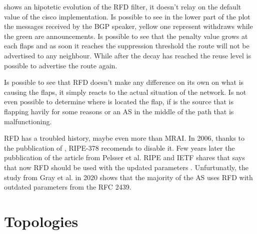  shows an hipotetic evolution of the \ac{RFD} filter,
it doesn't relay on the default value of the cisco implementation.
Is possible to see in the lower part of the plot the messages received by the
\ac{BGP} speaker, yellow one represent withdraws while the green are announcements.
Is possible to see that the penalty value grows at each flaps and as soon it reaches
the suppression threshold the route will not be advertised to any neighbour.
While after the decay has reached the reuse level is possible to advertise the
route again.

Is possible to see that \ac{RFD} doesn't make any difference on its own on what
is causing the flaps, it simply reacts to the actual situation of the network.
Is not even possible to determine where is located the flap, if is the source
that is flapping havily for some reasons or an \ac{AS} in the middle of the
path that is malfunctioning.

\ac{RFD} has a troubled history, maybe even more than \ac{MRAI}.
In \num{2006}, thanks to the pubblication of \cite{mao2002route}, RIPE-378
\cite{smith2006ripe} recomends to disable it.
Few years later the pubblication of the article from Pelsser et al. \cite{pelsser2011route}
RIPE and IETF shares that says that now \ac{RFD} should be used with the updated
parameters \cite{bush2013ripe,rfc7196}.
Unfurtunatly, the study from Gray et al. \cite{gray2020bgp} in \num{2020} shows
that the majority of the \ac{AS} uses \ac{RFD} with
outdated parameters from the \ac{RFC} {2439}.



\section{Topologies}
\label{sec:topologies}

